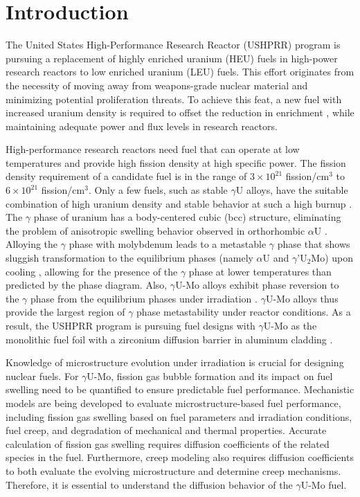 \documentclass{elsarticle}
\begin{document}
\section{Introduction}

The United States High-Performance Research Reactor (USHPRR) program is pursuing a replacement of highly enriched uranium (HEU) fuels in high-power research reactors to low enriched uranium (LEU) fuels. This effort originates from the necessity of moving away from weapons-grade nuclear material and minimizing potential proliferation threats. To achieve this feat, a new fuel with increased uranium density is required to offset the reduction in enrichment \cite{snelgrove1997, wilson2020}, while maintaining adequate power and flux levels in research reactors.

High-performance research reactors need fuel that can operate at low temperatures and provide high fission density at high specific power. The fission density requirement of a candidate fuel is in the range of $3 \times 10^{21}$ fission/cm$^3$ to $6 \times 10^{21}$ fission/cm$^3$. Only a few fuels, such as stable $\gamma$U alloys, have the suitable combination of high uranium density and stable behavior at such a high burnup \cite{meyer2014}. The $\gamma$ phase of uranium has a body-centered cubic (bcc) structure, eliminating the problem of anisotropic swelling behavior observed in orthorhombic $\alpha$U \cite{hofman1990, mahbuba2021}. Alloying the $\gamma$ phase with molybdenum leads to a metastable $\gamma$ phase that shows sluggish transformation to the equilibrium phases (namely $\alpha$U and $\gamma$'U$_2$Mo) upon cooling \cite{saller1955, dwight1960}, allowing for the presence of the $\gamma$ phase at lower temperatures than predicted by the phase diagram. Also, $\gamma$U-Mo alloys exhibit phase reversion to the $\gamma$ phase from the equilibrium phases under irradiation \cite{meyer2014, willard1965}. $\gamma$U-Mo alloys thus provide the largest region of $\gamma$ phase metastability under reactor conditions. As a result, the USHPRR program is pursuing fuel designs with $\gamma$U-Mo as the monolithic fuel foil with a zirconium diffusion barrier in aluminum cladding \cite{robinson2009, cole2016, miller2021}.

Knowledge of microstructure evolution under irradiation is crucial for designing nuclear fuels. For $\gamma$U-Mo, fission gas bubble formation and its impact on fuel swelling need to be quantified to ensure predictable fuel performance. Mechanistic models are being developed to evaluate microstructure-based fuel performance, including fission gas swelling based on fuel parameters and irradiation conditions, fuel creep, and degradation of mechanical and thermal properties. Accurate calculation of fission gas swelling requires diffusion coefficients of the related species in the fuel. Furthermore, creep modeling also requires diffusion coefficients to both evaluate the evolving microstructure and determine creep mechanisms. Therefore, it is essential to understand the diffusion behavior of the $\gamma$U-Mo fuel.
\end{document}
